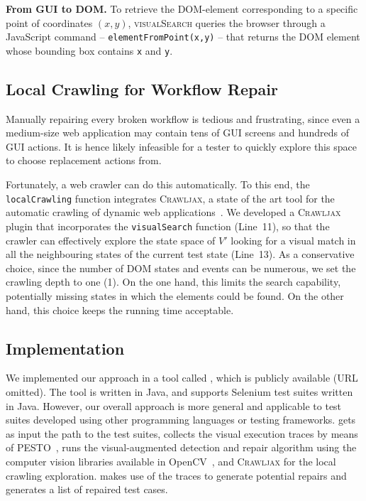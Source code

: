 \noindent
\textbf{From GUI to DOM.}
To retrieve the DOM-element corresponding to a specific point of coordinates $(x,y)$, \textsc{visualSearch} queries the browser through a JavaScript command -- \texttt{elementFromPoint(x,y)} -- that returns the DOM element whose bounding box contains \texttt{x} and \texttt{y}. 


\subsection{Local Crawling for Workflow Repair}

Manually repairing every broken workflow is tedious and frustrating, since even a medium-size web application may contain tens of GUI screens and hundreds of GUI actions. It is hence likely infeasible for a tester to quickly explore this space to choose replacement actions from.

Fortunately, a web crawler can do this automatically. To this end, the \texttt{localCrawling} function integrates \textsc{Crawljax}, a state of the art tool for the automatic crawling of dynamic web applications~\cite{mesbah:tweb12,mesbah:tse12}. We developed a \textsc{Crawljax} plugin that incorporates the \texttt{visualSearch} function (Line~11), so that the crawler can effectively explore the state space of $V'$ looking for a visual match in all the neighbouring states of the current test state (Line~13). As a conservative choice, since the number of DOM states and events can be numerous, we set the crawling depth to one (1). On the one hand, this limits the search capability, potentially missing states in which the elements could be found. On the other hand, this choice keeps the running time acceptable.

\subsection{Implementation}\label{sec:implementation}

We implemented our approach in a tool called \tool, which is publicly available (URL omitted). 
The tool is written in Java, and supports Selenium test suites written in Java. However, our overall approach is more general and applicable to test suites developed using other programming languages or testing frameworks. 
\tool gets as input the path to the test suites, collects the visual execution traces by means of \textsc{PESTO}~\cite{2014-Stocco-SCAM}, runs the visual-augmented detection and repair algorithm using the computer vision libraries available in OpenCV~\cite{}, and \textsc{Crawljax} for the local crawling exploration. 
\tool makes use of the traces to generate potential repairs and generates a list of repaired test cases.







